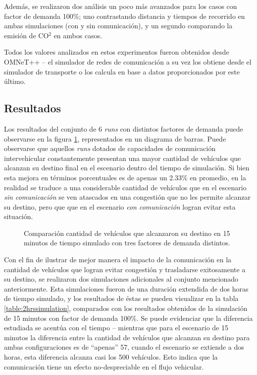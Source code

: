 Además, se realizaron dos análisis un poco más avanzados para los casos con factor de demanda 100\%; uno contrastando distancia y tiempos de recorrido en ambas simulaciones (con y sin comunicación), y un segundo comparando la emisión de CO$^{2}$ en ambos casos. 

Todos los valores analizados en estos experimentos fueron obtenidos desde OMNeT++ -- el simulador de redes de comunicación a su vez los obtiene desde el simulador de transporte o los calcula en base a datos proporcionados por este último. 

\subsection{Resultados}

Los resultados del conjunto de 6 \emph{runs} con distintos factores de demanda puede observarse en la figura \ref{fig:arrivedcomp}, representados en un diagrama de barras. Puede observarse que aquellos \emph{runs} dotados de capacidades de comunicación intervehicular constantemente presentan una mayor cantidad de vehículos que alcanzan su destino final en el escenario dentro del tiempo de simulación. Si bien esta mejora en términos porcentuales es de apenas un 2.33\% en promedio, en la realidad se traduce a una considerable cantidad de vehículos que en el escenario \emph{sin comunicación} se ven atascados en una congestión que no les permite alcanzar su destino, pero que que en el escenario \emph{con comunicación} logran evitar esta situación.

\begin{figure}[tpb]
    \centering
    
    \caption[Comparación cantidad de vehículos que alcanzaron su destino]{Comparación cantidad de vehículos que alcanzaron su destino en 15 minutos de tiempo simulado con tres factores de demanda distintos.}
    \label{fig:arrivedcomp}
\end{figure}

Con el fin de ilustrar de mejor manera el impacto de la comunicación en la cantidad de vehículos que logran evitar congestión y trasladarse exitosamente a su destino, se realizaron dos simulaciones adicionales al conjunto mencionado anteriormente. Esta simulaciones fueron de una duración extendida de dos horas de tiempo simulado, y los resultados de éstas se pueden visualizar en la tabla \ref{table:2hrssimulation}, comparados con los resultados obtenidos de la simulación de 15 minutos con factor de demanda 100\%. Se puede evidenciar que la diferencia estudiada se acentúa con el tiempo -- mientras que para el escenario de 15 minutos la diferencia entre la cantidad de vehículos que alcanzan su destino para ambas configuraciones es de ``apenas'' 57, cuando el escenario se extiende a dos horas, esta diferencia alcanza casi los 500 vehículos. Esto indica que la comunicación tiene un efecto no-despreciable en el flujo vehicular.

